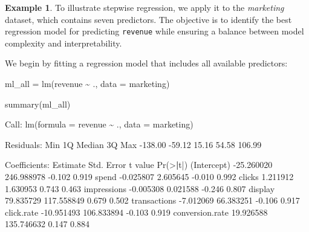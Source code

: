 \documentclass[
  11pt,
]{book}
\makeatletter
\newenvironment{Shaded}{}{}
\newcommand{\AttributeTok}[1]{#1}
\newcommand{\DecValTok}[1]{#1}
\newcommand{\ErrorTok}[1]{\textcolor[rgb]{0.21,0.21,0.21}{\textbf{#1}}}
\newcommand{\FloatTok}[1]{#1}
\newcommand{\FunctionTok}[1]{#1}
\newcommand{\NormalTok}[1]{#1}
\newcommand{\OtherTok}[1]{\textcolor[rgb]{0.39,0.39,0.39}{#1}}
\newcommand{\SpecialCharTok}[1]{\textcolor[rgb]{0.39,0.39,0.39}{#1}}
\newenvironment{kframe}{%
\medskip{}
\setlength{\fboxsep}{.8em}
 \def\at@end@of@kframe{}%
 \ifinner\ifhmode%
  \def\at@end@of@kframe{\end{minipage}}%
  \begin{minipage}{\columnwidth}%
 \fi\fi%
 \def\FrameCommand##1{\hskip\@totalleftmargin \hskip-\fboxsep
 \colorbox{shadecolor}{##1}\hskip-\fboxsep
     \hskip-\linewidth \hskip-\@totalleftmargin \hskip\columnwidth}%
 \MakeFramed {\advance\hsize-\width
   \@totalleftmargin\z@ \linewidth\hsize
   \@setminipage}}%
 {\par\unskip\endMakeFramed%
 \at@end@of@kframe}
\renewenvironment{Shaded}{\begin{kframe}}{\end{kframe}}
\theoremstyle{definition}
\theoremstyle{definition}
\newtheorem{example}{Example}[chapter]
\theoremstyle{definition}
\theoremstyle{definition}
\theoremstyle{remark}
\makeatother
\begin{document}
\begin{example}
\protect\hypertarget{exm:ex-stepwise-regression}{}\label{exm:ex-stepwise-regression}To illustrate stepwise regression, we apply it to the \emph{marketing} dataset, which contains seven predictors. The objective is to identify the best regression model for predicting \texttt{revenue} while ensuring a balance between model complexity and interpretability.

We begin by fitting a regression model that includes all available predictors:

\begin{Shaded}
\begin{Highlighting}[]
\NormalTok{ml\_all }\OtherTok{=} \FunctionTok{lm}\NormalTok{(revenue }\SpecialCharTok{\textasciitilde{}}\NormalTok{ ., }\AttributeTok{data =}\NormalTok{ marketing)}

\FunctionTok{summary}\NormalTok{(ml\_all)}
   
\NormalTok{   Call}\SpecialCharTok{:}
   \FunctionTok{lm}\NormalTok{(}\AttributeTok{formula =}\NormalTok{ revenue }\SpecialCharTok{\textasciitilde{}}\NormalTok{ ., }\AttributeTok{data =}\NormalTok{ marketing)}
   
\NormalTok{   Residuals}\SpecialCharTok{:}
\NormalTok{       Min      }\DecValTok{1}\NormalTok{Q  Median      }\DecValTok{3}\NormalTok{Q     Max }
   \SpecialCharTok{{-}}\FloatTok{138.00}  \SpecialCharTok{{-}}\FloatTok{59.12}   \FloatTok{15.16}   \FloatTok{54.58}  \FloatTok{106.99} 
   
\NormalTok{   Coefficients}\SpecialCharTok{:}
\NormalTok{                     Estimate Std. Error t value }\FunctionTok{Pr}\NormalTok{(}\SpecialCharTok{\textgreater{}}\ErrorTok{|}\NormalTok{t}\SpecialCharTok{|}\NormalTok{)}
\NormalTok{   (Intercept)     }\SpecialCharTok{{-}}\FloatTok{25.260020} \FloatTok{246.988978}  \SpecialCharTok{{-}}\FloatTok{0.102}    \FloatTok{0.919}
\NormalTok{   spend            }\SpecialCharTok{{-}}\FloatTok{0.025807}   \FloatTok{2.605645}  \SpecialCharTok{{-}}\FloatTok{0.010}    \FloatTok{0.992}
\NormalTok{   clicks            }\FloatTok{1.211912}   \FloatTok{1.630953}   \FloatTok{0.743}    \FloatTok{0.463}
\NormalTok{   impressions      }\SpecialCharTok{{-}}\FloatTok{0.005308}   \FloatTok{0.021588}  \SpecialCharTok{{-}}\FloatTok{0.246}    \FloatTok{0.807}
\NormalTok{   display          }\FloatTok{79.835729} \FloatTok{117.558849}   \FloatTok{0.679}    \FloatTok{0.502}
\NormalTok{   transactions     }\SpecialCharTok{{-}}\FloatTok{7.012069}  \FloatTok{66.383251}  \SpecialCharTok{{-}}\FloatTok{0.106}    \FloatTok{0.917}
\NormalTok{   click.rate      }\SpecialCharTok{{-}}\FloatTok{10.951493} \FloatTok{106.833894}  \SpecialCharTok{{-}}\FloatTok{0.103}    \FloatTok{0.919}
\NormalTok{   conversion.rate  }\FloatTok{19.926588} \FloatTok{135.746632}   \FloatTok{0.147}    \FloatTok{0.884}
   

\end{Highlighting}
\end{Shaded}
\end{example}
\end{document}
